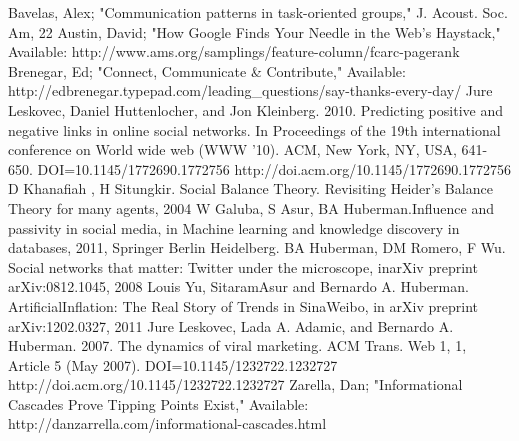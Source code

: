 \documentclass[conference,letterpaper]{IEEEtran}
\begin{document}
\begin{thebibliography}{1}
Bavelas, Alex; "Communication patterns in task-oriented groups," J. Acoust. Soc. Am, 22
Austin, David; "How Google Finds Your Needle in the Web's Haystack," Available: http://www.ams.org/samplings/feature-column/fcarc-pagerank
Brenegar, Ed; "Connect, Communicate \& Contribute," Available: http://edbrenegar.typepad.com/leading\_questions/say-thanks-every-day/
Jure Leskovec, Daniel Huttenlocher, and Jon Kleinberg. 2010. Predicting positive and negative links in online social networks. In Proceedings of the 19th international conference on World wide web (WWW '10). ACM, New York, NY, USA, 641-650. DOI=10.1145/1772690.1772756 http://doi.acm.org/10.1145/1772690.1772756
D Khanafiah , H Situngkir. Social Balance Theory. Revisiting Heider’s Balance Theory for many agents, 2004
W Galuba, S Asur, BA Huberman.Influence and passivity in social media, in Machine learning and knowledge discovery in databases, 2011, Springer Berlin Heidelberg.
BA Huberman, DM Romero, F Wu. Social networks that matter: Twitter under the microscope, inarXiv preprint arXiv:0812.1045, 2008
Louis Yu, SitaramAsur and Bernardo A. Huberman. ArtificialInflation: The Real Story of Trends in SinaWeibo, in arXiv preprint arXiv:1202.0327, 2011
Jure Leskovec, Lada A. Adamic, and Bernardo A. Huberman. 2007. The dynamics of viral marketing. ACM Trans. Web 1, 1, Article 5 (May 2007). DOI=10.1145/1232722.1232727 http://doi.acm.org/10.1145/1232722.1232727
Zarella, Dan; "Informational Cascades Prove Tipping Points Exist," Available: http://danzarrella.com/informational-cascades.html
\end{thebibliography}
\end{document}
